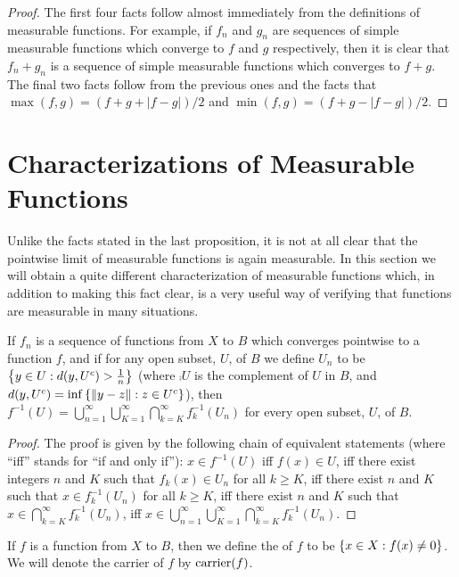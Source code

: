 \begin{proof}
The first four facts follow almost immediately from the definitions of measurable functions. For example, if $f_n$ and $g_n$ are sequences of simple measurable functions which converge to $f$ and $g$ respectively, then it is clear that $f_n+g_n$ is a sequence of simple measurable functions which converges to $f+g$. The final two facts follow from the previous ones and the facts that $\max(f, g)=(f+g+|f-g|)/2$ and $\min(f, g)=(f+g-|f-g|)/2$.
\end{proof}

\section{Characterizations of Measurable Functions}

Unlike the facts stated in the last proposition, it is not at all clear that the pointwise limit of measurable functions is again measurable. In this section we will obtain a quite different characterization of measurable functions which, in addition to making this fact clear, is a very useful way of verifying that functions are measurable in many situations.

\begin{lemma}
\label{lem:preimage of open set as sigma union intersection}
If $f_n$ is a sequence of functions from $X$ to $B$ which converges pointwise to a function $f$, and if for any open subset, $U$, of $B$ we define $U_n$ to be $\left\{y\in U:d(y,{U}^c)>\frac1n\right\}$ (where $\comp{U}$ is the complement of $U$ in $B$, and $d(y,{U}^c)=\inf\left\{\norm{y-z}:z\in{U}^c\right\}$), then $f^{-1}(U)=\bigcup_{n=1}^\infty\bigcup_{K=1}^\infty\bigcap_{k=K}^\infty f_k^{-1}(U_n)$ for every open subset, $U$, of $B$.
\end{lemma}

\begin{proof}
The proof is given by the following chain of equivalent statements (where ``iff'' stands for ``if and only if''): $x\in f^{-1}(U)$ iff $f(x)\in U$, iff there exist integers $n$ and $K$ such that $f_k(x)\in U_n$ for all $k\geq K$, iff there exist $n$ and $K$ such that $x\in f_k^{-1}(U_n)$ for all $k\geq K$, iff there exist $n$ and $K$ such that $x\in\bigcap_{k=K}^\infty f_k^{-1}(U_n)$, iff $x\in\bigcup_{n=1}^\infty\bigcup_{K=1}^\infty\bigcap_{k=K}^\infty f_k^{-1}(U_n)$.
\end{proof}

\begin{definition}
If $f$ is a function from $X$ to $B$, then we define the  of $f$ to be $\left\{x\in X: f(x)\neq 0\right\}$. We will denote the carrier of $f$ by $\operatorname{carrier}(f)$. 
\end{definition}

